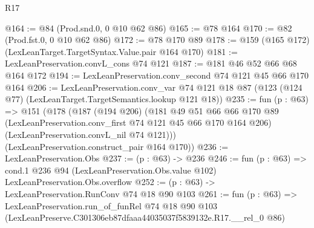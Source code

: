 \begin{lexlean}{R17}
\begin{coremodule}
@164 := @84 (Prod.snd.{0, 0} @10 @62 @86)
@165 := @78 @164
@170 := @82 (Prod.fst.{0, 0} @10 @62 @86)
@172 := @78 @170 @89
@178 := @159 (@165 @172) (LexLeanTarget.TargetSyntax.Value.pair @164 @170)
@181 := LexLeanPreservation.convL_cons @74 @121
@187 := @181 @46 @52 @66 @68 @164 @172
@194 := LexLeanPreservation.conv_second @74 @121 @45 @66 @170 @164
@206 := LexLeanPreservation.conv_var
    @74
    @121
    @18
    @87
    (@123 (@124 @77) (LexLeanTarget.TargetSemantics.lookup @121 @18))
@235 := fun (p : @63) =>
  @151
    (@178
      (@187
        (@194 @206)
        (@181
          @49
          @51
          @66
          @66
          @170
          @89
          (LexLeanPreservation.conv_first @74 @121 @45 @66 @170 @164 @206)
          (LexLeanPreservation.convL_nil @74 @121)))
      (LexLeanPreservation.construct_pair @164 @170))
@236 := LexLeanPreservation.Obs
@237 := (p : @63) -> @236
@246 := fun (p : @63) =>
  cond.{1} @236 @94 (LexLeanPreservation.Obs.value @102) LexLeanPreservation.Obs.overflow
@252 := (p : @63) -> LexLeanPreservation.RunConv @74 @18 @90 @103
@261 := fun (p : @63) =>
  LexLeanPreservation.run_of_funRel
    @74
    @18
    @90
    @103
    (LexLeanPreserve.C301306eb87dfaaa44035037f5839132e.R17.__rel_0 @86)
\end{coremodule}
\end{lexlean}
